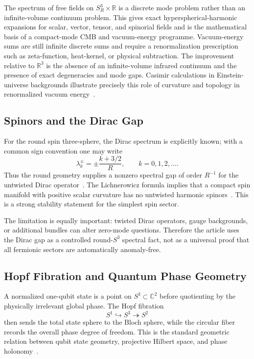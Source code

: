 \documentclass[aps,prd,onecolumn,superscriptaddress,longbibliography,nofootinbib,notitlepage]{revtex4-2}
\begin{document}
The spectrum of free fields on $S^3_R\times\mathbb R$ is a discrete mode problem
rather than an infinite-volume continuum problem. This gives exact
hyperspherical-harmonic expansions for scalar, vector, tensor, and spinorial
fields and is the mathematical basis of a compact-mode CMB and vacuum-energy
programme. Vacuum-energy sums are still infinite discrete sums and require a
renormalization prescription such as zeta-function, heat-kernel, or physical
subtraction. The improvement relative to $\mathbb R^3$ is the absence of an
infinite-volume infrared continuum and the presence of exact degeneracies and mode
gaps. Casimir calculations in Einstein-universe backgrounds illustrate precisely
this role of curvature and topology in renormalized vacuum energy~\cite{Mota2022}.

\subsection{Spinors and the Dirac Gap}

For the round spin three-sphere, the Dirac spectrum is explicitly known; with a
common sign convention one may write
\begin{equation}
  \lambda_k^{\pm}=\pm\frac{k+3/2}{R},
  \qquad
  k=0,1,2,\ldots .
\end{equation}
Thus the round geometry supplies a nonzero spectral gap of order $R^{-1}$ for
the untwisted Dirac operator~\cite{CamporesiHiguchi1996}. The Lichnerowicz
formula implies that a compact spin manifold with positive scalar curvature has
no untwisted harmonic spinors~\cite{GromovLawson1983}. This is a strong stability
statement for the simplest spin sector.

The limitation is equally important: twisted Dirac operators, gauge backgrounds,
or additional bundles can alter zero-mode questions. Therefore the article uses
the Dirac gap as a controlled round-$S^3$ spectral fact, not as a universal proof
that all fermionic sectors are automatically anomaly-free.

\subsection{Hopf Fibration and Quantum Phase Geometry}

A normalized one-qubit state is a point on $S^3\subset\mathbb C^2$ before
quotienting by the physically irrelevant global phase. The Hopf fibration
\begin{equation}
  S^1\hookrightarrow S^3\twoheadrightarrow S^2
\end{equation}
then sends the total state sphere to the Bloch sphere, while the circular fiber
records the overall phase degree of freedom. This is the standard geometric
relation between qubit state geometry, projective Hilbert space, and phase
holonomy~\cite{MosseriDandoloff2001}.
\end{document}
